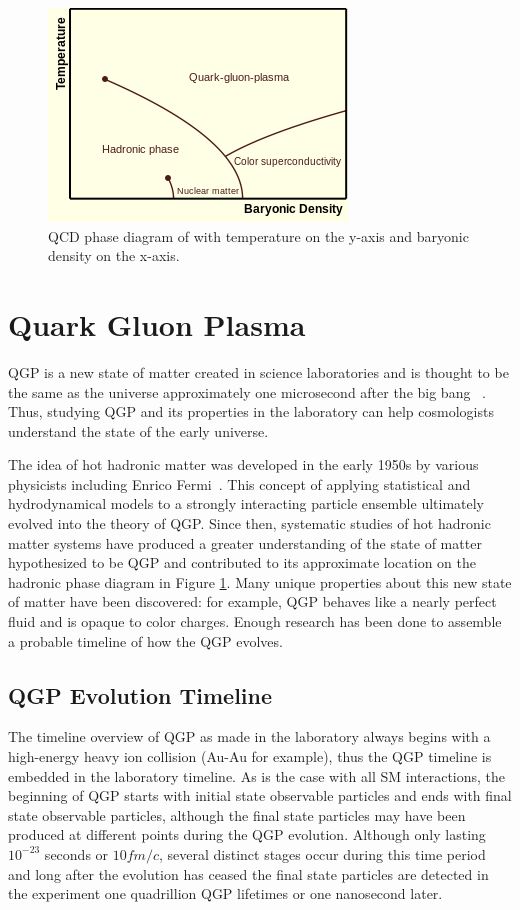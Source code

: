 \begin{figure}[!ht]
\begin{center}
\includegraphics[width=0.55\linewidth]{figs/qcd_phase_diagram.png}
\caption{QCD phase diagram of with temperature on the y-axis and baryonic density on the x-axis.}
\end{center}
\label{fig:qcd_phase}
\end{figure}

\section{Quark Gluon Plasma}
QGP is a new state of matter created in science laboratories and is thought to be the same as the universe approximately one microsecond after the big bang ~\cite{RAFELSKI2013155}. Thus, studying QGP and its properties in the laboratory can help cosmologists understand the state of the early universe.

The idea of hot hadronic matter was developed in the early 1950s by various physicists including Enrico Fermi~\cite{Fermi01071950}. This concept of applying statistical and hydrodynamical models to a strongly interacting particle ensemble ultimately evolved into the theory of QGP. Since then, systematic studies of hot hadronic matter systems have produced a greater understanding of the state of matter hypothesized to be QGP and contributed to its approximate location on the hadronic phase diagram in Figure \ref{fig:qcd_phase}. Many unique properties about this new state of matter have been discovered: for example, QGP behaves like a nearly perfect fluid and is opaque to color charges. Enough research has been done to assemble a probable timeline of how the QGP evolves.

\subsection{QGP Evolution Timeline}
The timeline overview of QGP as made in the laboratory always begins with a high-energy heavy ion collision (Au-Au for example), thus the QGP timeline is embedded in the laboratory timeline. As is the case with all SM interactions, the beginning of QGP starts with initial state observable particles and ends with final state observable particles, although the final state particles may have been produced at different points during the QGP evolution. Although only lasting $10^{-23}$ seconds or $10 fm/c$, several distinct stages occur during this time period and long after the evolution has ceased the final state particles are detected in the experiment one quadrillion QGP lifetimes or one nanosecond later.

